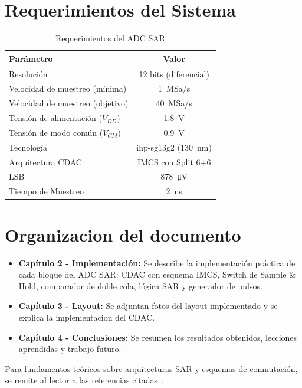 \documentclass[12pt,a4paper]{report}
\begin{document}
\section{Requerimientos del Sistema}

\begin{table}[H]
\centering
\caption{Requerimientos del ADC SAR}
\label{tab:specs}
\begin{tabular}{lc} %
\toprule
\textbf{Parámetro} & \textbf{Valor} \\
\midrule
Resolución & 12 bits (diferencial) \\
Velocidad de muestreo (mínima) & \SI{1}{MSa/s} \\
Velocidad de muestreo (objetivo) & \SI{40}{MSa/s} \\
Tensión de alimentación ($V_{DD}$) & \SI{1.8}{\volt} \\
Tensión de modo común ($V_{CM}$) & \SI{0.9}{\volt} \\
Tecnología & ihp-sg13g2 (\SI{130}{\nano\meter}) \\
Arquitectura CDAC & IMCS con Split 6+6 \\
LSB & \SI{878}{\micro\volt} \\
Tiempo de Muestreo & \SI{2}{\nano\second} \\
\bottomrule
\end{tabular}
\end{table}


\section{Organizacion del documento}
\begin{itemize}
    \item \textbf{Capítulo 2 - Implementación:} Se describe la implementación práctica de cada bloque del ADC SAR: CDAC con esquema IMCS, Switch de Sample \& Hold, comparador de doble cola, lógica SAR y generador de pulsos.
    
    \item \textbf{Capítulo 3 - Layout:} Se adjuntan fotos del layout implementado y se explica la implementacion del CDAC.
    
    \item \textbf{Capítulo 4 - Conclusiones:} Se resumen los resultados obtenidos, lecciones aprendidas y trabajo futuro.
\end{itemize}

Para fundamentos teóricos sobre arquitecturas SAR y esquemas de conmutación, se remite al lector a las referencias citadas~\cite{lowpower_survey, chang_sar_thesis}.
\end{document}
